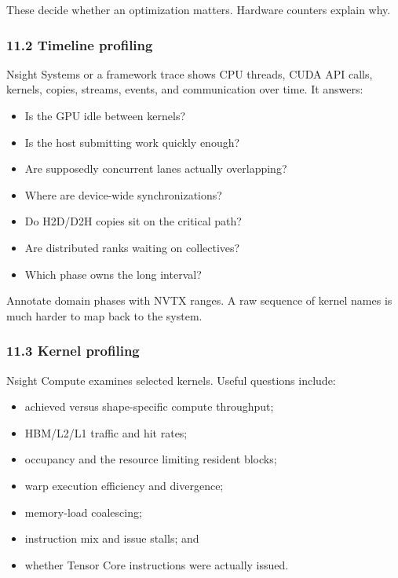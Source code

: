 \documentclass[
  10pt,
  letterpaper,
]{article}
\providecommand{\tightlist}{%
  \setlength{\itemsep}{0pt}\setlength{\parskip}{0pt}}
\begin{document}
These decide whether an optimization matters. Hardware counters explain
why.

\subsubsection{11.2 Timeline profiling}\label{112-timeline-profiling}

Nsight Systems or a framework trace shows CPU threads, CUDA API calls,
kernels, copies, streams, events, and communication over time. It
answers:

\begin{itemize}
\tightlist
\item
  Is the GPU idle between kernels?
\item
  Is the host submitting work quickly enough?
\item
  Are supposedly concurrent lanes actually overlapping?
\item
  Where are device-wide synchronizations?
\item
  Do H2D/D2H copies sit on the critical path?
\item
  Are distributed ranks waiting on collectives?
\item
  Which phase owns the long interval?
\end{itemize}

Annotate domain phases with NVTX ranges. A raw sequence of kernel names
is much harder to map back to the system.

\subsubsection{11.3 Kernel profiling}\label{113-kernel-profiling}

Nsight Compute examines selected kernels. Useful questions include:

\begin{itemize}
\tightlist
\item
  achieved versus shape-specific compute throughput;
\item
  HBM/L2/L1 traffic and hit rates;
\item
  occupancy and the resource limiting resident blocks;
\item
  warp execution efficiency and divergence;
\item
  memory-load coalescing;
\item
  instruction mix and issue stalls; and
\item
  whether Tensor Core instructions were actually issued.
\end{itemize}
\end{document}
